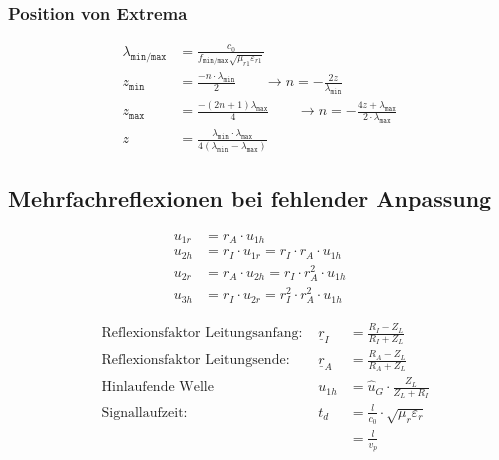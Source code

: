 \subsubsection{Position von Extrema}
\begin{align*}
    \lambda_\texttt{min/max}    & = \frac{c_0}{f_\texttt{min/max}\sqrt{\mu_{r1}\varepsilon_{r1}}}\\
    z_\texttt{min}              & =\frac{-n\cdot\lambda_\texttt{min}}{2}                                        \qquad\rightarrow n = -\frac{2z}{\lambda_\texttt{min}}                            \\
    z_\texttt{max}              & =\frac{-(2n+1)\lambda_\texttt{max}}{4}                                        \qquad\rightarrow n = -\frac{4z+\lambda_\texttt{max}}{2\cdot\lambda_\texttt{max}} \\
    z                           & = \frac{\lambda_\texttt{min}\cdot\lambda_\texttt{max}}{4(\lambda_\texttt{min}-\lambda_\texttt{max})}
\end{align*}

\subsection{Mehrfachreflexionen bei fehlender Anpassung}

\begin{align*}
    u_{1r} & = r_A\cdot u_{1h}                                \\
    u_{2h} & = r_I\cdot u_{1r} = r_I\cdot r_A\cdot u_{1h}     \\
    u_{2r} & = r_A\cdot u_{2h} = r_I\cdot r_A^2\cdot u_{1h}   \\
    u_{3h} & = r_I\cdot u_{2r} = r_I^2\cdot r_A^2\cdot u_{1h}
\end{align*}

\begin{align*}
     & \text{Reflexionsfaktor Leitungsanfang: } & \underline{r}_I & = \frac{R_I - Z_L}{R_I + Z_L}                 \\
     & \text{Reflexionsfaktor Leitungsende: }   & \underline{r}_A & = \frac{R_A - Z_L}{R_A + Z_L}                 \\
     & \text{Hinlaufende Welle}                 & u_{1h}          & = \hat{u}_G \cdot\frac{Z_L}{Z_L+R_I}          \\
     & \text{Signallaufzeit: }                  & t_d             & = \frac{l}{c_0}\cdot\sqrt{\mu_r\varepsilon_r} \\
     &                                          &                 & = \frac{l}{v_p}
\end{align*}
